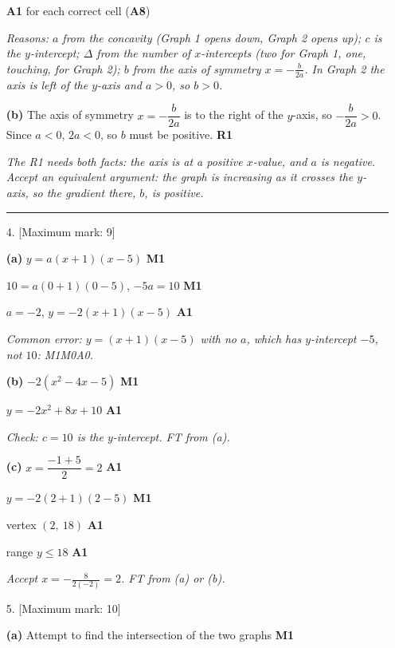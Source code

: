 \documentclass[12pt, twoside]{article}
\begin{document}
\begin{enumerate}[itemsep=0.3cm]
\hfill \textbf{A1} for each correct cell (\textbf{A8})

\emph{Reasons: $a$ from the concavity (Graph 1 opens down, Graph 2 opens up);
$c$ is the $y$-intercept; $\Delta$ from the number of $x$-intercepts (two
for Graph 1, one, touching, for Graph 2); $b$ from the axis of symmetry
$x = -\frac{b}{2a}$. In Graph 2 the axis is left of the $y$-axis and
$a > 0$, so $b > 0$.}

\textbf{(b)} The axis of symmetry $x = -\dfrac{b}{2a}$ is to the right of
the $y$-axis, so $-\dfrac{b}{2a} > 0$. Since $a < 0$, $2a < 0$, so $b$ must
be positive. \hfill \textbf{R1}

\emph{The R1 needs both facts: the axis is at a positive $x$-value, and
$a$ is negative. Accept an equivalent argument: the graph is increasing as
it crosses the $y$-axis, so the gradient there, $b$, is positive.}

\bigskip \hrule \bigskip

\item[4.] [Maximum mark: 9]

\textbf{(a)} $y = a(x + 1)(x - 5)$ \hfill \textbf{M1}

$10 = a(0 + 1)(0 - 5)$, \quad $-5a = 10$ \hfill \textbf{M1}

$a = -2$, \quad $y = -2(x + 1)(x - 5)$ \hfill \textbf{A1}

\emph{Common error: $y = (x + 1)(x - 5)$ with no $a$, which has
$y$-intercept $-5$, not $10$: M1M0A0.}

\textbf{(b)} $-2(x^{2} - 4x - 5)$ \hfill \textbf{M1}

$y = -2x^{2} + 8x + 10$ \hfill \textbf{A1}

\emph{Check: $c = 10$ is the $y$-intercept. FT from (a).}

\textbf{(c)} $x = \dfrac{-1 + 5}{2} = 2$ \hfill \textbf{A1}

$y = -2(2 + 1)(2 - 5)$ \hfill \textbf{M1}

vertex $(2,\ 18)$ \hfill \textbf{A1}

range $y \le 18$ \hfill \textbf{A1}

\emph{Accept $x = -\frac{8}{2(-2)} = 2$. FT from (a) or (b).}

\newpage

\item[5.] [Maximum mark: 10]

\textbf{(a)} Attempt to find the intersection of the two graphs \hfill \textbf{M1}


\end{enumerate}
\end{document}
